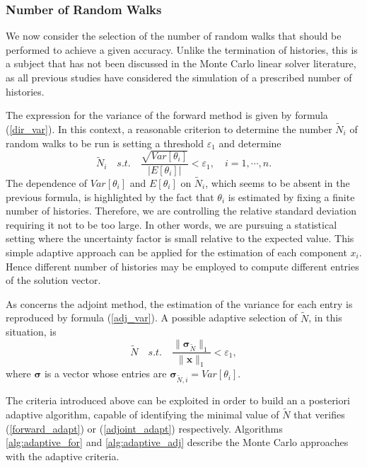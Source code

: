 \subsubsection{Number of Random Walks}

We now consider the selection of the number of random walks that should be
performed to achieve a given accuracy.  Unlike the termination of histories,
this is a subject that has not been discussed in the Monte Carlo linear
solver literature, as all previous studies have considered the simulation
of a prescribed number of histories.

The expression for the variance of the forward method is given by
formula (\ref{dir_var}).
In this context, a reasonable criterion to determine the number $\tilde{N}_i$
of random walks to be run is setting a threshold $\varepsilon_1$ and determine
\begin{equation}
\tilde{N}_i \quad s.t.\quad \frac{\sqrt{Var[\theta_i]}}{\lvert
E[\theta_i]\rvert}<\varepsilon_1, \quad i=1,\cdots,n.
\label{forward_adapt}
\end{equation}
The dependence of $Var[\theta_i]$ and $E[\theta_i]$ on $\tilde{N}_i$, which
seems
to be absent in the previous formula, is highlighted by the fact that
$\theta_i$
is estimated by fixing a finite number of histories.
Therefore, we are controlling the relative standard deviation requiring it not
to be too large. In other words, we are pursuing a statistical setting where the
uncertainty factor is small relative to the expected value.
This simple adaptive approach can be applied for the estimation of each
component $x_i$. Hence different number of histories may be employed to
compute different entries of the solution vector.

As concerns the adjoint method, the estimation of the variance for each entry
is reproduced by formula (\ref{adj_var}).
A possible adaptive selection of $\tilde{N}$, in this situation, is
\begin{equation}
\tilde{N} \quad s.t. \quad \frac{\lVert
\boldsymbol{\sigma}_{\tilde{N}}\rVert_1}{\lVert
\mathbf{x}\rVert_1}<\varepsilon_1,
\label{adjoint_adapt}
\end{equation}
where $\boldsymbol{\sigma}$ is a vector whose entries are
$\boldsymbol{\sigma}_{\tilde{N},i}=Var[\theta_i]$.

The criteria introduced above can be exploited in order to build
an a posteriori adaptive algorithm, capable of identifying the minimal value of
$\tilde{N}$ that verifies (\ref{forward_adapt}) or (\ref{adjoint_adapt})
respectively.
Algorithms \ref{alg:adaptive_for} and \ref{alg:adaptive_adj} describe
the Monte Carlo approaches with the adaptive criteria.

